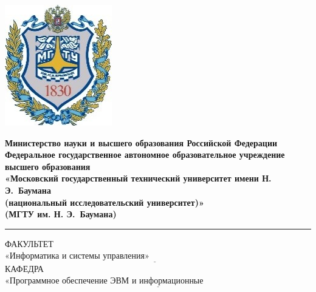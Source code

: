 \begin{titlepage}
	\fontsize{12pt}{12pt}\selectfont
	\noindent \begin{minipage}{0.15\textwidth}
		\includegraphics[width=\linewidth]{images/bmstu_logo.jpg}
	\end{minipage}
	\noindent\begin{minipage}{0.9\textwidth}\centering
		\textbf{Министерство науки и высшего образования Российской Федерации}\\
		\textbf{Федеральное государственное автономное образовательное учреждение высшего образования}\\
		\textbf{«Московский государственный технический университет имени Н. Э.~Баумана}\\
		\textbf{(национальный исследовательский университет)»}\\
		\textbf{(МГТУ им. Н. Э.~Баумана)}
	\end{minipage}
	
	\noindent\rule{18cm}{3pt}
	\newline\newline
	\noindent ФАКУЛЬТЕТ $\underline{\text{«Информатика и системы управления»~~~~~~~~~~~~~~~~~~~~~~~~~~~~~~~~~~~~~~~~~~~~~~~~~~~~~~~}}$ \newline\newline
	\noindent КАФЕДРА $\underline{\text{«Программное обеспечение ЭВМ и информационные технологии»~~~~~~~~~~~~~~~~~~~~~~~}}$\newline\newline\newline\newline\newline\newline\newline
	

\end{titlepage}
